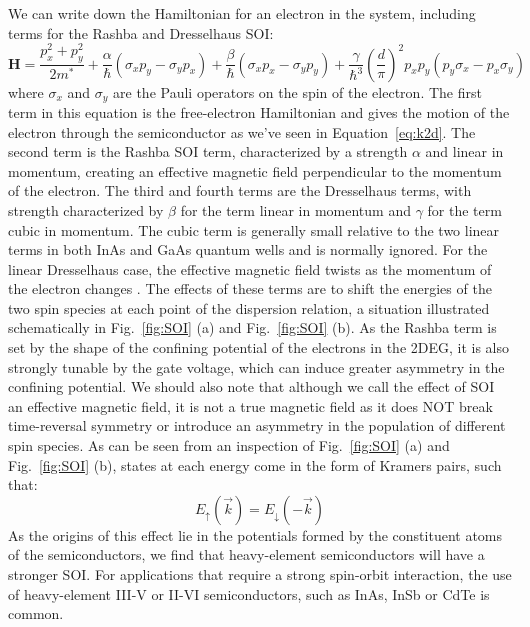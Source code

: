 We can write down the Hamiltonian for an electron in the system, including terms for the Rashba and Dresselhaus SOI:
\begin{equation}
  \mathbf{H} = \frac{p_x^2 + p_y^2}{2m^*} + \frac{\alpha}{\hbar}(\sigma_xp_y - \sigma_yp_x) + \frac{\beta}{\hbar}(\sigma_x p_x - \sigma_y p_y) +
  \frac{\gamma}{\hbar^3}\left(\frac{d}{\pi}\right)^2 p_x p_y (p_y\sigma_x-p_x\sigma_y)
\end{equation}
where $\sigma_x$ and $\sigma_y$ are the Pauli operators on the spin of the electron. The first term in this equation is the free-electron Hamiltonian and gives the motion of the electron through the semiconductor as we've seen in Equation~\ref{eq:k2d}. The second term is the Rashba SOI term, characterized
by a strength $\alpha$ and linear in momentum, creating an effective magnetic field perpendicular to the momentum of the electron. The third and fourth terms
are the Dresselhaus terms, with strength characterized by $\beta$ for the term linear in momentum and $\gamma$ for the term cubic in momentum. The cubic term is
generally small relative to the two linear terms in both InAs and GaAs quantum wells and is normally ignored. For the linear Dresselhaus case, the effective magnetic field twists
as the momentum of the electron changes \cite{PhysRev.100.580}. The effects of these terms are to shift the energies of the two spin species at each point of the dispersion
relation, a situation illustrated schematically in Fig.~\ref{fig:SOI} (a) and Fig.~\ref{fig:SOI} (b). As the Rashba term is set by the shape
of the confining potential of the electrons in the 2DEG, it is also strongly tunable by the gate voltage, which can induce greater asymmetry in the confining potential.
We should also note that although we call the effect of SOI an effective magnetic field, it is not a true magnetic field as
it does NOT break time-reversal symmetry or introduce an asymmetry in the population of different spin species. As can be seen from an inspection of
Fig.~\ref{fig:SOI} (a) and Fig.~\ref{fig:SOI} (b), states at each energy come in the form of Kramers pairs, such that:
\begin{equation}
  E_\uparrow(\vec k) = E_\downarrow(-\vec k)
\end{equation}
As the origins of this effect lie in the potentials formed by the constituent atoms of the semiconductors, we find that heavy-element semiconductors
will have a stronger SOI. For applications that require a strong spin-orbit interaction, the use of heavy-element III-V or II-VI semiconductors, such
as InAs, InSb or CdTe is common.

